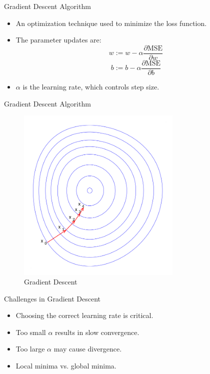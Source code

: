 \documentclass{beamer}
\begin{document}
\begin{frame}{Gradient Descent Algorithm}
    \begin{itemize}
        \item An optimization technique used to minimize the loss function.
        \item The parameter updates are:
        \[
        w := w - \alpha \frac{\partial \text{MSE}}{\partial w}
        \]
        \[
        b := b - \alpha \frac{\partial \text{MSE}}{\partial b}
        \]
        \item \(\alpha\) is the learning rate, which controls step size.
    \end{itemize}
\end{frame}

\begin{frame}{Gradient Descent Algorithm}
    \begin{figure}
        \centering
        \includegraphics[width=0.7\textwidth]{gradient.png}
        \caption{Gradient Descent}
    \end{figure}
\end{frame}

\begin{frame}{Challenges in Gradient Descent}
    \begin{itemize}
        \item Choosing the correct learning rate is critical.
        \item Too small \(\alpha\) results in slow convergence.
        \item Too large \(\alpha\) may cause divergence.
        \item Local minima vs. global minima.
    \end{itemize}
\end{frame}
\end{document}
